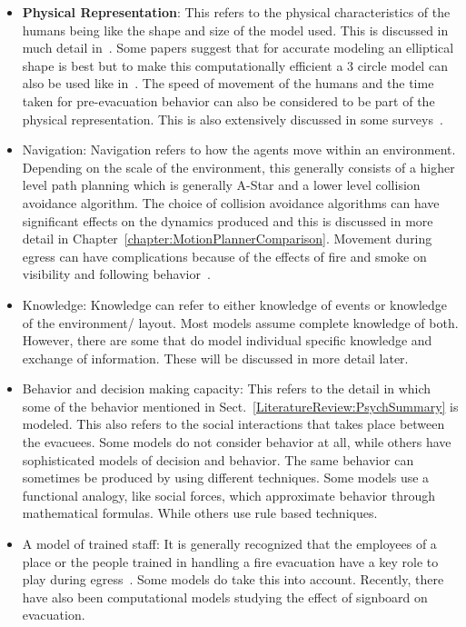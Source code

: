 \begin{itemize}
\item \textbf{Physical Representation}: This refers to the physical characteristics of the humans being like the shape and size of the model used. This is discussed in much detail in~\cite{Langston:2006kw,Still:2000tp}. Some papers suggest that for accurate modeling an elliptical shape is best but to make this computationally efficient a 3 circle model can also be used like in~\cite{Thompson:1995tm,Langston:2006kw}. The speed of movement of the humans and the time taken for pre-evacuation behavior can also be considered to be part of the physical representation. This is also extensively discussed in some surveys~\cite{Fahy:2010to,Proulx:1995wq}.

\item Navigation: Navigation refers to how the agents move within an environment. Depending on the scale of the environment, this generally consists of a higher level path planning which is generally A-Star and a lower level collision avoidance algorithm. The choice of collision avoidance algorithms can have significant effects on the dynamics produced and this is discussed in more detail in Chapter~\ref{chapter:MotionPlannerComparison}. Movement during egress can have complications because of the effects of fire and smoke on visibility and following behavior~\cite{Kobes:2009jx,Isobe:2003ep,Nagai:2004kl}.

\item Knowledge: Knowledge can refer to either knowledge of events or knowledge of the environment/ layout. Most models assume complete knowledge of both. However, there are some that do model individual specific knowledge and exchange of information. These will be discussed in more detail later.

\item Behavior and decision making capacity: This refers to the detail in which some of the behavior mentioned in Sect.~\ref{LiteratureReview:PsychSummary} is modeled. This also refers to the social interactions that takes place between the evacuees. Some models do not consider behavior at all, while others have sophisticated models of decision and behavior. The same behavior can sometimes be produced by using different techniques. Some models use a functional analogy, like social forces, which approximate behavior through mathematical formulas. While others use rule based techniques.

\item A model of trained staff: It is generally recognized that the employees of a place or the people trained in handling a fire evacuation have a key role to play during egress~\cite{Paulsen:1984ti,Aguirre:2004tn,Andree:2008td,Proulx:2001we}. Some models do take this into account. Recently, there have also been computational models studying the effect of signboard on evacuation.

\end{itemize}

